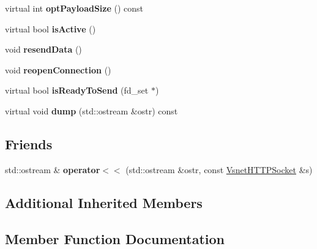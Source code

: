 \begin{DoxyCompactItemize}
\item 
virtual int {\bfseries opt\+Payload\+Size} () const \hypertarget{classVsnetHTTPSocket_a0a8e97f69202b2e367f9f4bece10e3b5}{}\label{classVsnetHTTPSocket_a0a8e97f69202b2e367f9f4bece10e3b5}

\item 
virtual bool {\bfseries is\+Active} ()\hypertarget{classVsnetHTTPSocket_a62118ca0477a3440bed7044e7eb4b172}{}\label{classVsnetHTTPSocket_a62118ca0477a3440bed7044e7eb4b172}

\item 
void {\bfseries resend\+Data} ()\hypertarget{classVsnetHTTPSocket_ac4f1907ed766574c761f91ad388fa753}{}\label{classVsnetHTTPSocket_ac4f1907ed766574c761f91ad388fa753}

\item 
void {\bfseries reopen\+Connection} ()\hypertarget{classVsnetHTTPSocket_acc289670559e6ee1a68fee6ccbb56953}{}\label{classVsnetHTTPSocket_acc289670559e6ee1a68fee6ccbb56953}

\item 
virtual bool {\bfseries is\+Ready\+To\+Send} (fd\+\_\+set $\ast$)\hypertarget{classVsnetHTTPSocket_a1f2070739c68f09abe80a70a4a836474}{}\label{classVsnetHTTPSocket_a1f2070739c68f09abe80a70a4a836474}

\item 
virtual void {\bfseries dump} (std\+::ostream \&ostr) const \hypertarget{classVsnetHTTPSocket_a9b77c8a5a2ec9c9faf72af47fd652114}{}\label{classVsnetHTTPSocket_a9b77c8a5a2ec9c9faf72af47fd652114}

\end{DoxyCompactItemize}
\subsection*{Friends}
\begin{DoxyCompactItemize}
\item 
std\+::ostream \& {\bfseries operator$<$$<$} (std\+::ostream \&ostr, const \hyperlink{classVsnetHTTPSocket}{Vsnet\+H\+T\+T\+P\+Socket} \&s)\hypertarget{classVsnetHTTPSocket_ac33c2e1cdff14606ecfc130c98479111}{}\label{classVsnetHTTPSocket_ac33c2e1cdff14606ecfc130c98479111}

\end{DoxyCompactItemize}
\subsection*{Additional Inherited Members}


\subsection{Member Function Documentation}
